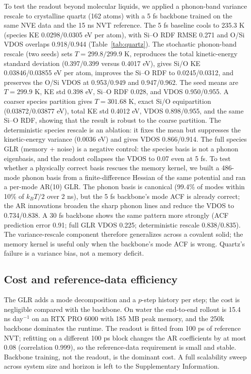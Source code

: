 To test the readout beyond molecular liquids, we applied a phonon-band variance rescale to
crystalline quartz (162 atoms) with a 5 fs backbone trained on the same NVE data and the 15 ns
NVT reference. The 5 fs baseline cools to 235.3 K (species KE 0.0298/0.0305 eV per atom), with
Si--O RDF RMSE 0.271 and O/Si VDOS overlaps 0.918/0.944 (Table~\ref{tab:quartz}). The stochastic
phonon-band rescale (two seeds) sets \(T=299.8/299.9\) K, reproduces the total kinetic-energy
standard deviation (0.397/0.399 versus 0.4017 eV), gives Si/O KE 0.03846/0.03855 eV per atom,
improves the Si--O RDF to 0.0245/0.0312, and preserves the O/Si VDOS at 0.953/0.949 and
0.947/0.962. The seed means are \(T=299.9\) K, KE std 0.398 eV, Si--O RDF 0.028, and VDOS
0.950/0.955. A coarser species partition
gives \(T=301.68\) K, exact Si/O equipartition (0.03872/0.03877 eV), total KE std 0.4012 eV,
VDOS 0.898/0.955, and the same Si--O RDF, showing that the result is robust to the coarse
partition. The deterministic species rescale is an ablation: it fixes the mean but suppresses the
kinetic-energy variance (0.0036 eV) and gives VDOS 0.866/0.914. The full species GLR (memory +
noise) is a negative control: the species basis is not a phonon eigenbasis, and the readout
collapses the VDOS to 0.07 even at 5 fs. To test whether a physically correct basis rescues the
memory kernel, we built a 486-mode phonon basis from a finite-difference Hessian of the same
potential and ran a per-mode AR(10) GLR. The phonon basis is canonical (99.4\% of modes within
10\% of \(k_BT/2\) over 2 ns), but the 5 fs backbone's mode ACF is already correct; the AR
innovations broaden the sharp phonon lines and reduce the VDOS to 0.734/0.838. A 30 fs backbone
shows the same pattern more strongly (ACF prediction error 0.91; full GLR VDOS 0.225;
deterministic rescale 0.838/0.835). The variance-rescale component therefore generalizes across a
covalent solid; the memory kernel is useful only when the backbone's mode ACF is wrong. Quartz's
failure is a variance bias, not a memory deficit.



\subsection{Cost and reference-data efficiency}

The GLR adds a mode decomposition and a \(p\)-step history per step; the cost is negligible
compared with the backbone. On water the end-to-end rollout is 15.4 ns day\(^{-1}\) on an RTX
PRO 6000 with 185 MB peak memory, and the 250k backbone dominates the runtime. The readout is
fitted from 100 ps of reference NVT; refitting on a different 100 ps block changes the AR
coefficients by at most 0.08 (correlation 0.999), so the reference-data requirement is small and
stable. Backbone training, not the readout, is the dominant cost. A full scalability sweep across
system size and horizon is left to the Supplementary Information.

